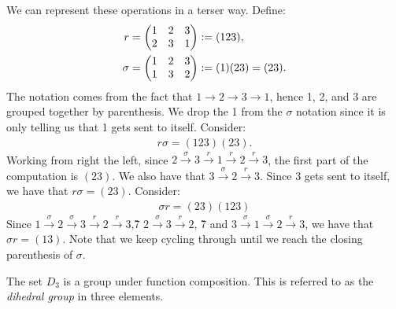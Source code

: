 \begin{example}
        We can represent these operations in a terser way. Define:
            \begin{equation*}
            \begin{split}
                r &= \left( \begin{matrix} 1 & 2 & 3 \\ 2 & 3 & 1 \end{matrix} \right) := (1 2 3), \\
                \sigma &= \left( \begin{matrix} 1 & 2 & 3 \\ 1 & 3 & 2 \end{matrix} \right) := (1)(23) = (23).
            \end{split}
            \end{equation*}
        The notation comes from the fact that $1 \rightarrow 2 \rightarrow 3 \rightarrow 1$, hence 1, 2, and $3$ are grouped together by parenthesis. We drop the 1 from the $\sigma$ notation since it is only telling us that 1 gets sent to itself. Consider:
            \begin{equation*}
            \begin{split}
                r \sigma = (123)(23).
            \end{split}
            \end{equation*}
        Working from right the left, since $2 \xrightarrow{\sigma} 3 \xrightarrow{r} 1 \xrightarrow{r} 2 \xrightarrow{r} 3$, the first part of the computation is $(23)$. We also have that $3 \xrightarrow{\sigma} 2 \xrightarrow{r} 3$. Since 3 gets sent to itself, we have that $r \sigma = (23)$. Consider:
            \begin{equation*}
            \begin{split}
                \sigma r = (23)(123)
            \end{split}
            \end{equation*}
        Since $1 \xrightarrow{\sigma} 2 \xrightarrow{\sigma} 3 \xrightarrow{r} 2 \xrightarrow{r} 3$,\h7 $2 \xrightarrow{\sigma} 3 \xrightarrow{r} 2$, \h7 and $3 \xrightarrow{\sigma} 1 \xrightarrow{\sigma} 2 \xrightarrow{r} 3$, we have that $\sigma r = (13)$. Note that we keep cycling through until we reach the closing parenthesis of $\sigma$.

        The set $D_3$ is a group under function composition. This is referred to as the \textit{dihedral group} in three elements.
    \end{example}

